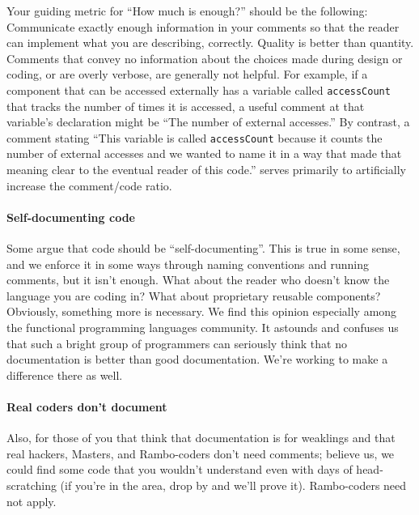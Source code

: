 \documentclass[10pt,letter]{article}
\begin{document}
Your guiding metric for ``How much is enough?'' should be the following: Communicate exactly enough information in your comments so that the reader can implement what you are describing, correctly.
Quality is better than quantity. Comments that convey no information about the choices made during design or coding, or are overly verbose, are generally not helpful. For example, if a component that can be accessed externally has a variable called \texttt{accessCount} that tracks the number of times it is accessed, a useful comment at that variable’s declaration might be ``The number of external accesses.'' By contrast, a comment stating ``This variable is called \texttt{accessCount} because it counts the number of external accesses and we wanted to name it in a way that made that meaning clear to the eventual reader of this code.'' serves primarily to artificially increase the comment/code ratio. 

\paragraph{Self-documenting code}

Some argue that code should be ``self-documenting''. This is true in some sense, and we enforce it in some ways through naming conventions and running comments, but it isn't enough. What about the reader who doesn't know the language you are coding in? What about proprietary reusable components? Obviously, something more is necessary.
We find this opinion especially among the functional programming languages community. It astounds and confuses us that such a bright group of programmers can seriously think that no documentation is better than good documentation. We're working to make a difference there as well.

\paragraph{Real coders don't document}

Also, for those of you that think that documentation is for weaklings and that real hackers, Masters, and Rambo-coders don't need comments; believe us, we could find some code that you wouldn't understand even with days of head-scratching (if you're in the area, drop by and we'll prove it). Rambo-coders need not apply.
\end{document}
